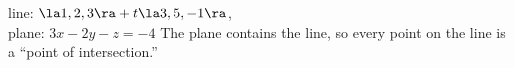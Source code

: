 {line: $\la 1,2,3\ra + t\la 3,5,-1\ra$,\\
plane: $3x-2y-z=-4$
}
{The plane contains the line, so every point on the line is a ``point of intersection.''
}

